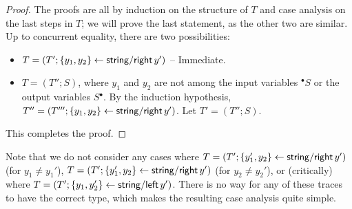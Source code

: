 \begin{proof}
The proofs are all by induction on the structure of $T$ and case
analysis on the last steps in $T$; we will prove the last statement, as
the other two are similar. Up to concurrent equality, there are two
possibilities:
\begin{itemize}
\item $T = (T'; \{{y_1, y_2}\} \leftarrow {{\sf string/right}\,y'})$ -- Immediate.
\item $T = (T''; S)$, where $y_1$ and $y_2$ are not among the input variables ${^\bullet}S$ or the output variables $S{^\bullet}$. By the 
induction hypothesis, $T'' = (T'''; \{{y_1,y_2}\} \leftarrow {{\sf string/right}\,y'})$.
Let $T' = (T''; S)$. 
\end{itemize}
This completes the proof. 
\end{proof}

Note that we do not consider any cases where 
$T = (T'; \{{y_1',y_2}\} \leftarrow {{\sf string/right}\,y'})$ (for $y_1 \neq y_1'$),
$T = (T'; \{{y_1',y_2}\} \leftarrow {{\sf string/right}\,y'})$ (for $y_2 \neq y_2'$),
or (critically) where 
$T = (T'; \{{y_1,y_2'}\} \leftarrow {{\sf string/left}\,y'})$. There is no 
way for any of these traces to have the correct type, which makes
the resulting case analysis quite simple. 

